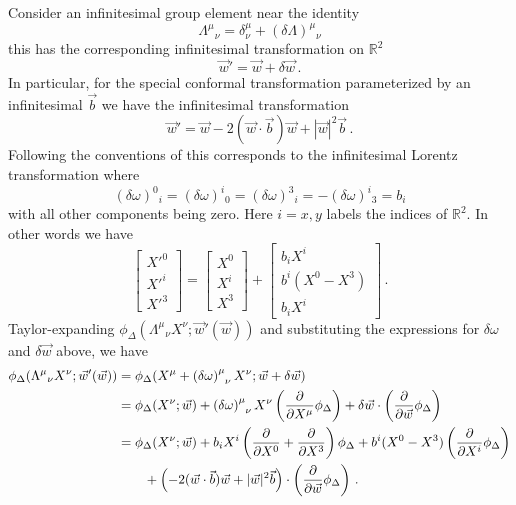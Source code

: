 \documentclass{brownthesis}
\begin{document}
Consider an infinitesimal group element near the identity
\[
\Lambda^{\mu}{}_{\nu}=\delta_{\nu}^{\mu}+(\delta\Lambda)^{\mu}{}_{\nu}
\]
this has the corresponding infinitesimal transformation on $\mathbb{R}^{2}$
\[
\vec{w}'=\vec{w}+\delta\vec{w}\,.
\]
In particular, for the special conformal transformation parameterized
by an infinitesimal $\vec{b}$ we have the infinitesimal transformation
\[
\vec{w}'=\vec{w}-2(\vec{w}\cdot\vec{b})\vec{w}+|\vec{w}|^{2}\vec{b}\,.
\]
Following the conventions of \cite{Pasterski:2017kqt} this corresponds
to the infinitesimal Lorentz transformation where
\[
(\delta\omega)^{0}{}_{i}=(\delta\omega)^{i}{}_{0}=(\delta\omega)^{3}{}_{i}=-(\delta\omega)^{i}{}_{3}=b_{i}
\]
with all other components being zero. Here $i=x,y$ labels the indices
of $\mathbb{R}^{2}$. In other words we have
\[
\begin{bmatrix}X'^{0}\\
X'^{i}\\
X'^{3}
\end{bmatrix}=\begin{bmatrix}X^{0}\\
X^{i}\\
X^{3}
\end{bmatrix}+\begin{bmatrix}b_{i}X^{i}\\
b^{i}(X^{0}-X^{3})\\
b_{i}X^{i}
\end{bmatrix}\,.
\]
Taylor-expanding $\phi_{\Delta}(\Lambda^{\mu}{}_{\nu}X^{\nu};\vec{w}'(\vec{w}))$
and substituting the expressions for $\delta\omega$ and $\delta\vec{w}$
above, we have
\begin{align*}
\phi_{\Delta}(\Lambda^{\mu}{}_{\nu}X^{\nu};\vec{w}'(\vec{w})) & =\phi_{\Delta}(X^{\mu}+\left(\delta\omega\right)_{\enskip\nu}^{\mu}X^{\nu};\vec{w}+\delta\vec{w})\\
 & =\phi_{\Delta}(X^{\nu};\vec{w})+\left(\delta\omega\right)_{\enskip\nu}^{\mu}X^{\nu}\left(\frac{\partial}{\partial X^{\mu}}\phi_{\Delta}\right)+\delta\vec{w}\cdot\left(\frac{\partial}{\partial\vec{w}}\phi_{\Delta}\right)\\
 & =\phi_{\Delta}(X^{\nu};\vec{w})+b_{i}X^{i}\left(\frac{\partial}{\partial X^{0}}+\frac{\partial}{\partial X^{3}}\right)\phi_{\Delta}+b^{i}(X^{0}-X^{3})\left(\frac{\partial}{\partial X^{i}}\phi_{\Delta}\right)\\
 & \qquad+\left(-2(\vec{w}\cdot\vec{b})\vec{w}+|\vec{w}|^{2}\vec{b}\right)\cdot\left(\frac{\partial}{\partial\vec{w}}\phi_{\Delta}\right)\,.
\end{align*}
\end{document}

